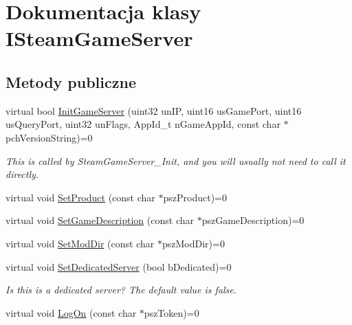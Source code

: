 \hypertarget{class_i_steam_game_server}{}\section{Dokumentacja klasy I\+Steam\+Game\+Server}
\label{class_i_steam_game_server}
\subsection*{Metody publiczne}
\begin{DoxyCompactItemize}
\item 
\mbox{\label{class_i_steam_game_server_ab3070f705e64b3232297ed0ac22ea3d6}} 
virtual bool \hyperlink{class_i_steam_game_server_ab3070f705e64b3232297ed0ac22ea3d6}{Init\+Game\+Server} (uint32 un\+IP, uint16 us\+Game\+Port, uint16 us\+Query\+Port, uint32 un\+Flags, App\+Id\+\_\+t n\+Game\+App\+Id, const char $\ast$pch\+Version\+String)=0
\begin{DoxyCompactList}\small\item\em This is called by Steam\+Game\+Server\+\_\+\+Init, and you will usually not need to call it directly. \end{DoxyCompactList}\item 
virtual void \hyperlink{class_i_steam_game_server_a372776d31b9693579e5703f2a2ea2e69}{Set\+Product} (const char $\ast$psz\+Product)=0
\item 
virtual void \hyperlink{class_i_steam_game_server_a475be416147c6fe13bb3532c829650f2}{Set\+Game\+Description} (const char $\ast$psz\+Game\+Description)=0
\item 
virtual void \hyperlink{class_i_steam_game_server_aecfcae1904680ae8d49164b4e4eb5e6f}{Set\+Mod\+Dir} (const char $\ast$psz\+Mod\+Dir)=0
\item 
\mbox{\label{class_i_steam_game_server_a81f53905d4aa5eb8fc6e8d785384c8a9}} 
virtual void \hyperlink{class_i_steam_game_server_a81f53905d4aa5eb8fc6e8d785384c8a9}{Set\+Dedicated\+Server} (bool b\+Dedicated)=0
\begin{DoxyCompactList}\small\item\em Is this is a dedicated server? The default value is false. \end{DoxyCompactList}\item 
virtual void \hyperlink{class_i_steam_game_server_aeb0b8c4368d82afaef1f00de926108ff}{Log\+On} (const char $\ast$psz\+Token)=0

\end{DoxyCompactItemize}
